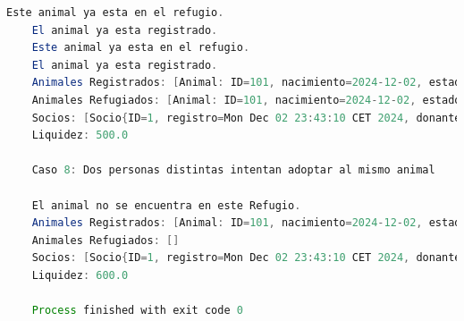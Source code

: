 \begin{lstlisting}[style = javaNormal, language=Java]
    Este animal ya esta en el refugio.
    El animal ya esta registrado.
    Este animal ya esta en el refugio.
    El animal ya esta registrado.
    Animales Registrados: [Animal: ID=101, nacimiento=2024-12-02, estado=DISPONIBLE, Animal: ID=102, nacimiento=2024-12-02, estado=ENTRATAMIENTO]
    Animales Refugiados: [Animal: ID=101, nacimiento=2024-12-02, estado=DISPONIBLE, Animal: ID=102, nacimiento=2024-12-02, estado=ENTRATAMIENTO]
    Socios: [Socio{ID=1, registro=Mon Dec 02 23:43:10 CET 2024, donante=null, voluntario=Voluntario 1, adoptante=null}]
    Liquidez: 500.0
    
    Caso 8: Dos personas distintas intentan adoptar al mismo animal
    
    El animal no se encuentra en este Refugio.
    Animales Registrados: [Animal: ID=101, nacimiento=2024-12-02, estado=ADOPTADO]
    Animales Refugiados: []
    Socios: [Socio{ID=1, registro=Mon Dec 02 23:43:10 CET 2024, donante=Donante 1, voluntario=Voluntario 1, adoptante=Adoptante 1}, Socio{ID=2, registro=Mon Dec 02 23:43:10 CET 2024, donante=null, voluntario=Voluntario 2, adoptante=Adoptante 2}]
    Liquidez: 600.0
    
    Process finished with exit code 0
\end{lstlisting}
